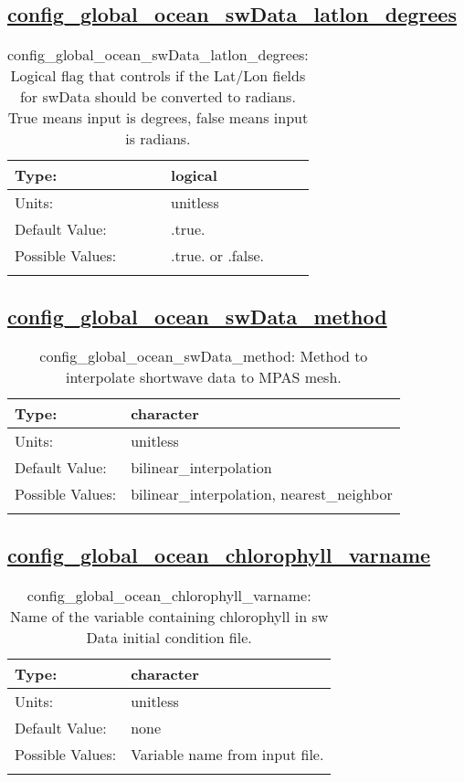 \subsection[config\_global\_ocean\_swData\_latlon\_degrees]{\hyperref[sec:nm_tab_global_ocean]{config\_global\_ocean\_swData\_latlon\_degrees}}
\label{subsec:nm_sec_config_global_ocean_swData_latlon_degrees}
\begin{center}
\begin{longtable}{| p{2.0in} || p{4.0in} |}
    \hline
    Type: & logical \\
    \hline
    Units: & \si{unitless} \\
    \hline
    Default Value: & .true. \\
    \hline
    Possible Values: & .true. or .false. \\
    \hline
    \caption{config\_global\_ocean\_swData\_latlon\_degrees: Logical flag that controls if the Lat/Lon fields for swData should be converted to radians. True means input is degrees, false means input is radians.}
\end{longtable}
\end{center}
\subsection[config\_global\_ocean\_swData\_method]{\hyperref[sec:nm_tab_global_ocean]{config\_global\_ocean\_swData\_method}}
\label{subsec:nm_sec_config_global_ocean_swData_method}
\begin{center}
\begin{longtable}{| p{2.0in} || p{4.0in} |}
    \hline
    Type: & character \\
    \hline
    Units: & \si{unitless} \\
    \hline
    Default Value: & bilinear\_interpolation \\
    \hline
    Possible Values: & bilinear\_interpolation, nearest\_neighbor \\
    \hline
    \caption{config\_global\_ocean\_swData\_method: Method to interpolate shortwave data to MPAS mesh.}
\end{longtable}
\end{center}
\subsection[config\_global\_ocean\_chlorophyll\_varname]{\hyperref[sec:nm_tab_global_ocean]{config\_global\_ocean\_chlorophyll\_varname}}
\label{subsec:nm_sec_config_global_ocean_chlorophyll_varname}
\begin{center}
\begin{longtable}{| p{2.0in} || p{4.0in} |}
    \hline
    Type: & character \\
    \hline
    Units: & \si{unitless} \\
    \hline
    Default Value: & none \\
    \hline
    Possible Values: & Variable name from input file. \\
    \hline
    \caption{config\_global\_ocean\_chlorophyll\_varname: Name of the variable containing chlorophyll in sw Data initial condition file.}
\end{longtable}
\end{center}
